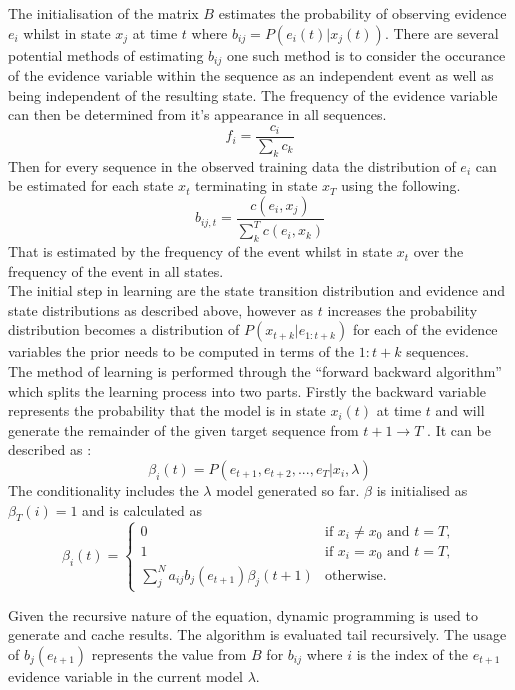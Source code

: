 \documentclass[11pt]{article}
\begin{document}
The initialisation of the matrix $B$ estimates the probability of observing evidence $e_i$ whilst in state $x_j$ at time $t$ where $b_{ij} = P(e_i(t)|x_j(t))$. There are several potential methods of estimating $b_{ij}$ one such method is to consider the occurance of the evidence variable within the sequence as an independent event as well as being independent of the resulting state. The frequency of the evidence variable can then be determined from it's appearance in all sequences.
$$
f_i = \frac{c_i}{\sum_k c_k}
$$
Then for every sequence in the observed training data the distribution of $e_i$ can be estimated for each state $x_t$ terminating in state $x_T$ using the following.
$$
b_{ij,t} = \frac{c(e_i, x_j)}{\sum_k^T c(e_i, x_k) }   
$$
That is estimated by the frequency of the event whilst in state $x_t$ over the frequency of the event in all states.\\

The initial step in learning are the state transition distribution and evidence and state distributions as described above, however as $t$ increases the probability distribution becomes a distribution of $P(x_{t+k}|e_{1:t+k})$ for each of the evidence variables the prior needs to be computed in terms of the  ${1:t+k}$ sequences. \\

The method of learning is performed through the ``forward backward algorithm'' which splits the learning process into two parts. Firstly the backward variable represents the probability that the model is in state $x_i(t)$ at time $t$ and will generate the remainder of the given target sequence from $t+1 \rightarrow T$ \cite{pc}. It can be described as \cite{rab}:
$$
\beta_i(t) = P(e_{t+1}, e_{t+2},...,e_T|x_i,\lambda)
$$
The conditionality includes the $\lambda$ model generated so far. $\beta$ is initialised as $\beta_T(i) = 1$ and is calculated as \cite{pc} 
\begin{equation*}
\beta_i(t) = \left\{
    \begin{array}{rl}
    0 &\text{if }x_i \neq x_0 \text{ and } t = T,\\
    1 &\text{if }x_i = x_0 \text{ and } t = T,\\
    \sum_j^N a_{ij}b_j(e_{t+1})\beta_j(t+1) & \text{otherwise}. 
    \end{array}
\right.
\end{equation*}

Given the recursive nature of the equation, dynamic programming is used to generate and cache results. The algorithm is evaluated tail recursively. The usage of $b_j(e_{t+1})$ represents the value from $B$ for $b_{ij}$ where $i$ is the index of the $e_{t+1}$ evidence variable in the current model $\lambda$.\\
\end{document}
